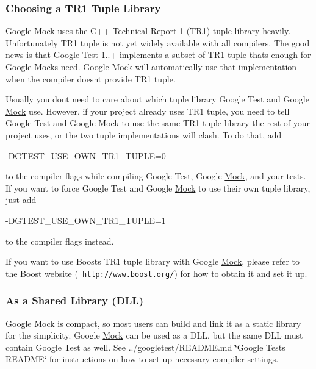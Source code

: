 \subsubsection*{Choosing a T\+R1 Tuple Library}

Google \mbox{\hyperlink{classMock}{Mock}} uses the C++ Technical Report 1 (T\+R1) tuple library heavily. Unfortunately T\+R1 tuple is not yet widely available with all compilers. The good news is that Google Test 1..+ implements a subset of T\+R1 tuple that\textquotesingle{}s enough for Google \mbox{\hyperlink{classMock}{Mock}}\textquotesingle{}s need. Google \mbox{\hyperlink{classMock}{Mock}} will automatically use that implementation when the compiler doesn\textquotesingle{}t provide T\+R1 tuple.

Usually you don\textquotesingle{}t need to care about which tuple library Google Test and Google \mbox{\hyperlink{classMock}{Mock}} use. However, if your project already uses T\+R1 tuple, you need to tell Google Test and Google \mbox{\hyperlink{classMock}{Mock}} to use the same T\+R1 tuple library the rest of your project uses, or the two tuple implementations will clash. To do that, add \begin{DoxyVerb}-DGTEST_USE_OWN_TR1_TUPLE=0
\end{DoxyVerb}


to the compiler flags while compiling Google Test, Google \mbox{\hyperlink{classMock}{Mock}}, and your tests. If you want to force Google Test and Google \mbox{\hyperlink{classMock}{Mock}} to use their own tuple library, just add \begin{DoxyVerb}-DGTEST_USE_OWN_TR1_TUPLE=1
\end{DoxyVerb}


to the compiler flags instead.

If you want to use Boost\textquotesingle{}s T\+R1 tuple library with Google \mbox{\hyperlink{classMock}{Mock}}, please refer to the Boost website (\href{http://www.boost.org/}{\texttt{ http\+://www.\+boost.\+org/}}) for how to obtain it and set it up.

\subsubsection*{As a Shared Library (D\+LL)}

Google \mbox{\hyperlink{classMock}{Mock}} is compact, so most users can build and link it as a static library for the simplicity. Google \mbox{\hyperlink{classMock}{Mock}} can be used as a D\+LL, but the same D\+LL must contain Google Test as well. See ../googletest/\+R\+E\+A\+D\+ME.md \char`\"{}\+Google Test\textquotesingle{}s R\+E\+A\+D\+M\+E\char`\"{} for instructions on how to set up necessary compiler settings.

